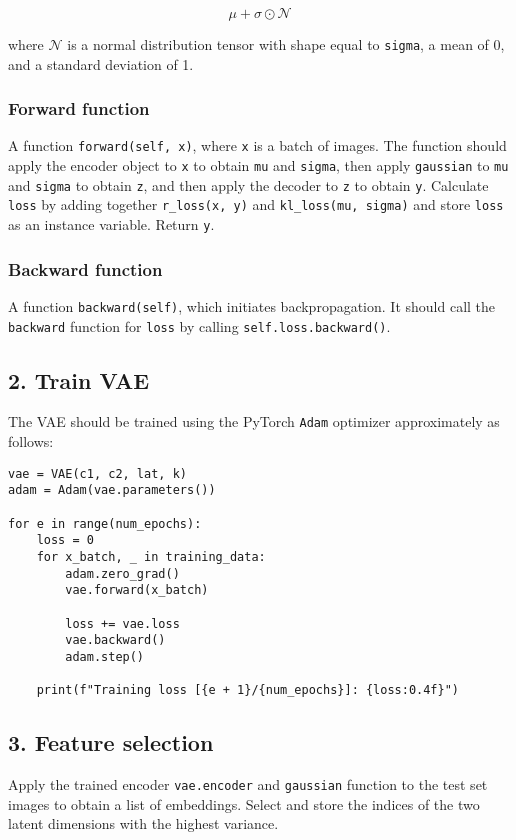 \documentclass{article}
\begin{document}
\[\mu + \sigma \odot \mathcal{N}\]

\noindent
where $\mathcal{N}$ is a normal distribution tensor with shape equal to \texttt{sigma}, a mean of 0, and a standard deviation of 1.

\subsubsection*{Forward function}
A function \texttt{forward(self, x)}, where \texttt{x} is a batch of images. The function should apply the encoder object to \texttt{x} to obtain \texttt{mu} and \texttt{sigma}, then apply \texttt{gaussian} to \texttt{mu} and \texttt{sigma} to obtain \texttt{z}, and then apply the decoder to \texttt{z} to obtain \texttt{y}. Calculate \texttt{loss} by adding together \texttt{r\_loss(x, y)} and \texttt{kl\_loss(mu, sigma)} and store \texttt{loss} as an instance variable. Return \texttt{y}.

\subsubsection*{Backward function}
A function \texttt{backward(self)}, which initiates backpropagation. It should call the \texttt{backward} function for \texttt{loss} by calling \texttt{self.loss.backward()}.

\subsection*{2. Train VAE}
The VAE should be trained using the PyTorch \texttt{Adam} optimizer approximately as follows:

\begin{verbatim}
vae = VAE(c1, c2, lat, k)
adam = Adam(vae.parameters())

for e in range(num_epochs):
    loss = 0
    for x_batch, _ in training_data:
        adam.zero_grad()
        vae.forward(x_batch)

        loss += vae.loss
        vae.backward()
        adam.step()

    print(f"Training loss [{e + 1}/{num_epochs}]: {loss:0.4f}")
\end{verbatim}

\subsection*{3. Feature selection}
Apply the trained encoder \texttt{vae.encoder} and \texttt{gaussian} function to the test set images to obtain a list of embeddings. Select and store the indices of the two latent dimensions with the highest variance.
\end{document}
